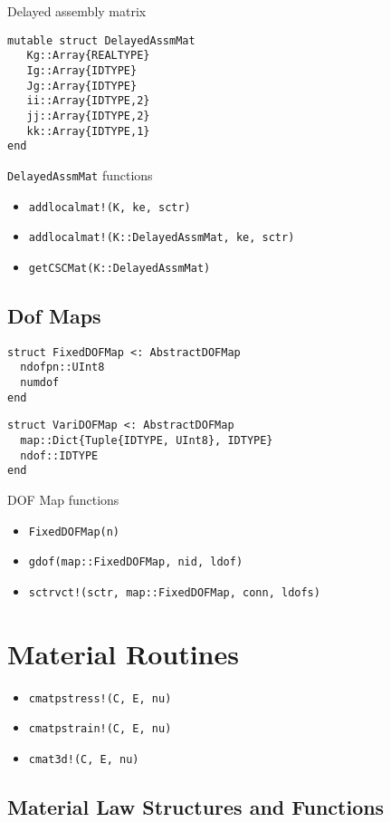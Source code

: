 \documentclass[11pt]{article} %
\begin{document}
Delayed assembly matrix
\begin{verbatim}
mutable struct DelayedAssmMat
   Kg::Array{REALTYPE}
   Ig::Array{IDTYPE}
   Jg::Array{IDTYPE}
   ii::Array{IDTYPE,2}
   jj::Array{IDTYPE,2}
   kk::Array{IDTYPE,1}
end
\end{verbatim}
\texttt{DelayedAssmMat} functions
\begin{itemize}
\item \texttt{addlocalmat!(K, ke, sctr)}
\item \texttt{addlocalmat!(K::DelayedAssmMat, ke, sctr)}
\item \texttt{getCSCMat(K::DelayedAssmMat)}
\end{itemize}

\subsection{Dof Maps}

\begin{verbatim}
struct FixedDOFMap <: AbstractDOFMap
  ndofpn::UInt8
  numdof
end
\end{verbatim}


\begin{verbatim}
struct VariDOFMap <: AbstractDOFMap
  map::Dict{Tuple{IDTYPE, UInt8}, IDTYPE}
  ndof::IDTYPE
end
\end{verbatim}

DOF Map functions
\begin{itemize}
\item \texttt{FixedDOFMap(n)}
\item \texttt{gdof(map::FixedDOFMap, nid, ldof)}
\item \texttt{sctrvct!(sctr, map::FixedDOFMap, conn, ldofs)}
\end{itemize}

\section{Material Routines}
\begin{itemize}
\item \texttt{cmatpstress!(C, E, nu)}
\item \texttt{cmatpstrain!(C, E, nu)}
\item \texttt{cmat3d!(C, E, nu)}
\end{itemize}

\subsection{Material Law Structures and Functions}
\end{document}
